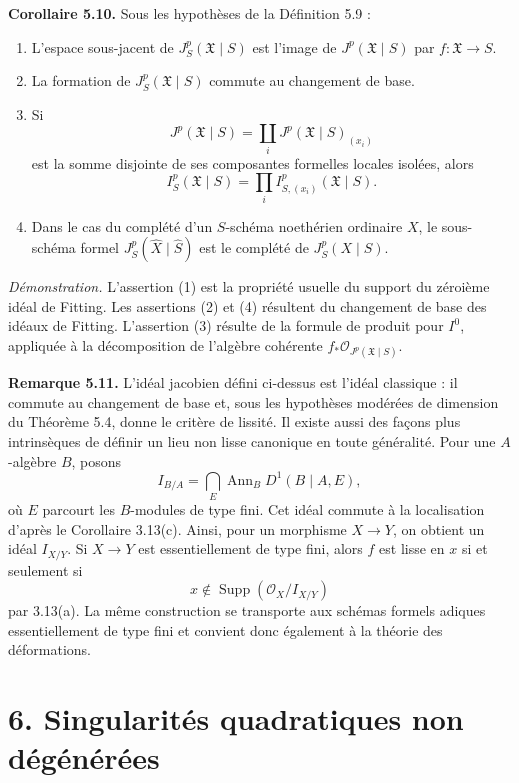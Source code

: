 \documentclass[11pt]{article}
\providecommand{\Supp}{\operatorname{Supp}}
\providecommand{\Ann}{\operatorname{Ann}}
\providecommand{\Oo}{\mathcal O}
\begin{document}
\textbf{Corollaire 5.10.}  Sous les hypothèses de la Définition 5.9 :
\begin{enumerate}[label=(\arabic*)]
\item L'espace sous-jacent de \(J^p_S(\mathfrak X\mid S)\) est l'image de \(J^p(\mathfrak X\mid S)\) par \(f:\mathfrak X\to S\).
\item La formation de \(J^p_S(\mathfrak X\mid S)\) commute au changement de base.
\item Si
\[
        J^p(\mathfrak X\mid S)=\coprod_i J^p(\mathfrak X\mid S)_{(x_i)}
\]
est la somme disjointe de ses composantes formelles locales isolées, alors
\[
        I^p_S(\mathfrak X\mid S)
        =
        \prod_i I^p_{S,(x_i)}(\mathfrak X\mid S).
\]
\item Dans le cas du complété d'un \(S\)-schéma noethérien ordinaire \(X\), le sous-schéma formel \(J^p_S(\widehat X\mid \widehat S)\) est le complété de \(J^p_S(X\mid S)\).
\end{enumerate}

\emph{Démonstration.}  L'assertion (1) est la propriété usuelle du support du zéroième idéal de Fitting.  Les assertions (2) et (4) résultent du changement de base des idéaux de Fitting.  L'assertion (3) résulte de la formule de produit pour \(I^0\), appliquée à la décomposition de l'algèbre cohérente \(f_*\Oo_{J^p(\mathfrak X\mid S)}\).

\textbf{Remarque 5.11.}  L'idéal jacobien défini ci-dessus est l'idéal classique : il commute au changement de base et, sous les hypothèses modérées de dimension du Théorème 5.4, donne le critère de lissité.  Il existe aussi des façons plus intrinsèques de définir un lieu non lisse canonique en toute généralité.  Pour une \(A\)-algèbre \(B\), posons
\[
        I_{B/A}
        =
        \bigcap_E
        \Ann_B D^1(B\mid A,E),
\]
où \(E\) parcourt les \(B\)-modules de type fini.  Cet idéal commute à la localisation d'après le Corollaire 3.13(c).  Ainsi, pour un morphisme \(X\to Y\), on obtient un idéal \(I_{X/Y}\).  Si \(X\to Y\) est essentiellement de type fini, alors \(f\) est lisse en \(x\) si et seulement si
\[
        x\notin \Supp(\Oo_X/I_{X/Y})
\]
par 3.13(a).  La même construction se transporte aux schémas formels adiques essentiellement de type fini et convient donc également à la théorie des déformations.

\section*{6. Singularités quadratiques non dégénérées}
\end{document}
